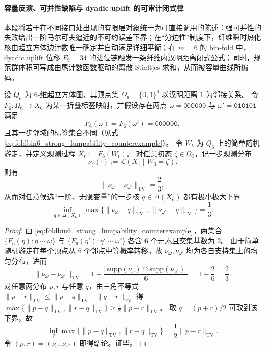\paragraph{容量反演、可并性缺陷与 dyadic uplift 的可审计闭式律}
本段将若干在不同接口处出现的有限层对象统一为可直接调用的陈述：强可并性的失败给出一阶马尔可夫逼近的不可约误差下界；在“分边性”制度下，纤维瞬时热化核由超立方体边计数唯一确定并自动满足详细平衡；在 \(m=6\) 的 bin-fold 中，dyadic uplift 位移 \(F_9=34\) 的进位链触发一条纤维内汉明距离闭式公式；同时，规范群体积可写成由尾计数函数驱动的离散 Stieltjes 求和，从而被容量曲线所编码。

\begin{theorem}[强可并性缺陷的定量下界：\(m=6\) 的最优一阶马尔可夫逼近误差]\label{thm:foldbin6-strong-lumpability-minimax-markov-error}
设 \(Q_6\) 为 \(6\)-维超立方体图，其顶点集 \(\Omega_6=\{0,1\}^6\) 以汉明距离 \(1\) 为邻接关系。
令 \(F_6:\Omega_6\to X_6\) 为某一折叠标签映射，并假设存在两点
\(
\omega=\texttt{000000}
\)
与
\(
\omega'=\texttt{010101}
\)
满足
\[
F_6(\omega)=F_6(\omega')=\texttt{000000},
\]
且其一步邻域的标签集合不同（见式 \eqref{eq:foldbin6_strong_lumpability_counterexample}）。
令 \(W_t\) 为 \(Q_6\) 上的简单随机游走，并定义观测过程 \(X_t:=F_6(W_t)\)。
对任意初态 \(\zeta\in\Omega_6\)，记一步观测分布
\[
\nu_\zeta(\cdot):=\mathcal L(X_1\mid W_0=\zeta).
\]
则有
\[
\|\nu_\omega-\nu_{\omega'}\|_{\mathrm{TV}}=\frac{2}{3},
\]
从而对任意候选“一阶、无隐变量”的一步核 \(q\in\Delta(X_6)\) 都有极小极大下界
\[
\inf_{q\in\Delta(X_6)}\max\bigl\{\|\nu_\omega-q\|_{\mathrm{TV}},\ \|\nu_{\omega'}-q\|_{\mathrm{TV}}\bigr\}
=\frac{1}{3}.
\]
\end{theorem}

\begin{proof}
由 \eqref{eq:foldbin6_strong_lumpability_counterexample}，两集合
\(
\{F_6(\eta):\eta\sim\omega\}
\)
与
\(
\{F_6(\eta'):\eta'\sim\omega'\}
\)
各含 \(6\) 个元素且交集基数为 \(2\)。
由于简单随机游走在每个顶点从 \(6\) 个邻点中等概率转移，故 \(\nu_\omega,\nu_{\omega'}\) 均为各自支持集上的均匀分布，进而
\[
\|\nu_\omega-\nu_{\omega'}\|_{\mathrm{TV}}
=1-\frac{|\,\mathrm{supp}(\nu_\omega)\cap \mathrm{supp}(\nu_{\omega'})\,|}{6}
=1-\frac{2}{6}
=\frac{2}{3}.
\]
对任意两分布 \(p,r\) 与任意 \(q\)，由三角不等式
\(
\|p-r\|_{\mathrm{TV}}\le \|p-q\|_{\mathrm{TV}}+\|q-r\|_{\mathrm{TV}}
\)
得
\(
\max\{\|p-q\|_{\mathrm{TV}},\|r-q\|_{\mathrm{TV}}\}\ge \frac12\|p-r\|_{\mathrm{TV}}
\)。
取 \(q=(p+r)/2\) 可取到该下界，故
\[
\inf_q\max\{\|p-q\|_{\mathrm{TV}},\|r-q\|_{\mathrm{TV}}\}
=\frac12\|p-r\|_{\mathrm{TV}}.
\]
令 \((p,r)=(\nu_\omega,\nu_{\omega'})\) 即得结论。证毕。
\end{proof}

